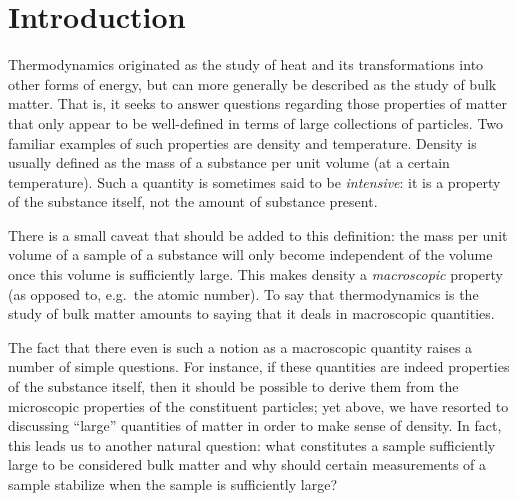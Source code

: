 
\chapter{Introduction}
\label{sec:intro}


Thermodynamics originated as the study of heat and its transformations into other
forms of energy, but can more generally be described as the study of
bulk matter. That is, it seeks to
answer questions regarding those properties of matter that only appear to be
well-defined in terms of large collections of particles. Two familiar examples of
such properties are density and temperature. Density is usually defined as the mass
of a substance per unit volume (at a certain temperature). Such a quantity is
sometimes said to be \emph{intensive}: it is a property of the substance itself,
not the amount of substance present.

There is a small caveat that should be added to this definition: the mass per unit
volume of a sample of a substance will only become independent of the volume once
this volume is sufficiently large. This makes density
a \emph{macroscopic} property (as opposed to, e.g.\ the
atomic number). To say that thermodynamics is the study of bulk
matter amounts to saying that it deals in macroscopic quantities.

The fact that there even is such a notion as a macroscopic quantity
raises a number of simple questions. For instance, if these quantities
are indeed properties of the substance itself, then it should be possible to 
derive them from the microscopic properties of the constituent particles;
yet above, we have resorted to discussing ``large'' quantities of matter in order
to make sense of density. In fact, this leads us to another natural question: what
constitutes a sample sufficiently large to be considered bulk matter and why should
certain measurements of a sample stabilize when the sample is sufficiently large?

